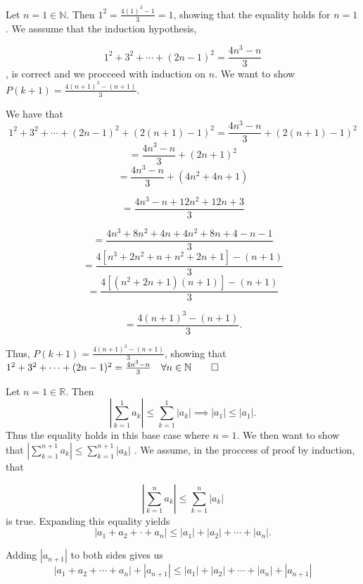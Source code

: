 \documentclass{report}
\begin{document}
\bigskip
{}
\sol

Let $n=1 \in \mathbb{N}$. Then $1^2 =  \frac{4 (1)^{3}-1}{3} = 1$, showing that the equality holds for $n=1$. We asssume that the induction hypothesis,

$$ 1^{2}+3^{2}+\cdots+(2 n-1)^{2}=\frac{4 n^{3}-n}{3} $$,
is correct and we procceed with induction on $n$. We want to show $P(k+1) = \frac{4 (n+1)^{3}-(n+1)}{3}$.

We have that
$$ 
1^{2}+3^{2}+\cdots+(2 n-1)^{2} +(2 (n+1)-1)^{2}=\frac{4 n^{3}-n}{3} + (2 (n+1)-1)^{2} 
$$  
$$ 
=\frac{4 n^{3}-n}{3} + (2n+1)^{2} 
$$  
$$ 
=\frac{4 n^{3}-n}{3} + (4n^2+4n +1) 
$$  

$$ 
=\frac{4 n^{3}-n+12n^2+12n +3}{3}
$$  

$$ 
=\frac{4 n^{3} + 8n^2 + 4n + 4n^2 + 8n + 4 -n -1}{3}
$$  
$$ 
=\frac{4 [n^{3} + 2n^2 + n + n^2 + 2n + 1] -(n +1)}{3}
$$  
$$ 
=\frac{4 [(n^{2} + 2n + 1)(n+1)] -(n+1)}{3}
$$  

$$ 
=\frac{4 (n+1)^3 -(n+1)}{3}.
$$  

Thus, $P(k+1) = \frac{4 (n+1)^{3}-(n+1)}{3}$, showing that $1^{2}+3^{2}+\cdots+(2 n-1)^{2}=\frac{4 n^{3}-n}{3} \quad \forall n \in \mathbb{N} \qed$  

\bigskip
{}

Let $n=1 \in \mathbb{R}$. Then 
$$
\left|\sum_{k=1}^{1} a_{k}\right| \leq \sum_{k=1}^{1}\left|a_{k}\right| \implies
\left|a_1\right| \leq \left| a_1\right|. $$ Thus the equality holds in this base case where $n=1$. We then want to show that $\left|\sum_{k=1}^{n+1} a_{k}\right| \leq \sum_{k=1}^{n+1}\left|a_{k}\right|$
.
We assume, in the proccess of proof by induction, that

$$
\left|\sum_{k=1}^{n} a_{k}\right| \leq \sum_{k=1}^{n}\left|a_{k}\right|$$ is true.
Expanding this equality yields
$$                                                                       
\left|a_1 + a_2 + \cdot + a_n\right| \leq \left|a_{1}\right| + \left|a_{2}\right|
+ \cdots +  \left|a_{n}\right|.$$

Adding $\left|a_{n+1}\right|$ to both sides gives us
$$
\left|a_1 + a_2 + \cdots + a_n\right| + \left|a_{n+1}\right|  \leq \left|a_{1}\right| + \left|a_{2}\right|
+ \cdots +  \left|a_{n}\right|  + \left|a_{n+1}\right|$$
\end{document}
